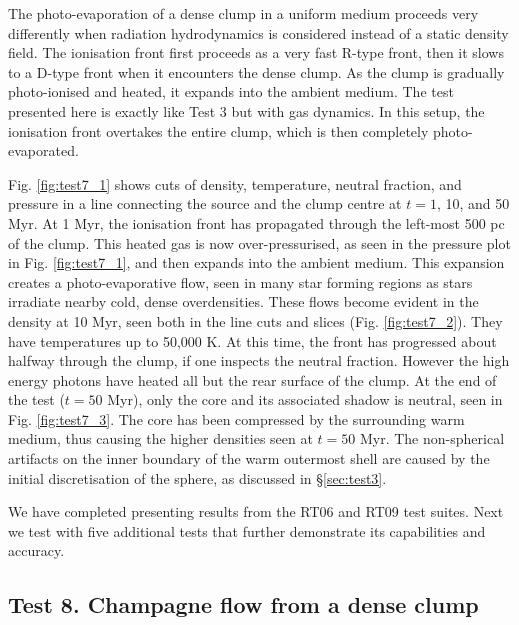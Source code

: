 \documentclass[useAMS,usenatbib]{mn2e}
\begin{document}
\begin{figure*}
  \caption{\label{fig:test7_3} Test 7. (Photo-evaporation of a dense
    clump).  Same as Fig. \ref{fig:test7_1} but at $t = 50$ Myr.}
\end{figure*}

The photo-evaporation of a dense clump in a uniform medium proceeds
very differently when radiation hydrodynamics is considered instead of
a static density field.  The ionisation front first proceeds as a very
fast R-type front, then it slows to a D-type front when it encounters
the dense clump.  As the clump is gradually photo-ionised and heated,
it expands into the ambient medium.  The test presented here is
exactly like Test 3 but with gas dynamics.  In this setup, the
ionisation front overtakes the entire clump, which is then completely
photo-evaporated.

Fig. \ref{fig:test7_1} shows cuts of density, temperature, neutral
fraction, and pressure in a line connecting the source and the clump
centre at $t = 1$, 10, and 50 Myr.  At 1 Myr, the ionisation front has
propagated through the left-most 500 pc of the clump.  This heated gas
is now over-pressurised, as seen in the pressure plot in Fig.
\ref{fig:test7_1}, and then expands into the ambient medium.  This
expansion creates a photo-evaporative flow, seen in many star forming
regions \citep[e.g. M16;][]{Hester96} as stars irradiate nearby cold,
dense overdensities.  These flows become evident in the density at 10
Myr, seen both in the line cuts and slices (Fig. \ref{fig:test7_2}).
They have temperatures up to 50,000 K.  At this time, the front has
progressed about halfway through the clump, if one inspects the
neutral fraction.  However the high energy photons have heated all but
the rear surface of the clump.  At the end of the test ($t = 50$ Myr),
only the core and its associated shadow is neutral, seen in Fig.
\ref{fig:test7_3}.  The core has been compressed by the surrounding
warm medium, thus causing the higher densities seen at $t = 50$ Myr.
The non-spherical artifacts on the inner boundary of the warm
outermost shell are caused by the initial discretisation of the
sphere, as discussed in \S\ref{sec:test3}.

We have completed presenting results from the RT06 and RT09 test
suites.  Next we test \moray with five additional tests that further
demonstrate its capabilities and accuracy.

\subsection{Test 8. Champagne flow from a dense clump}
\end{document}
